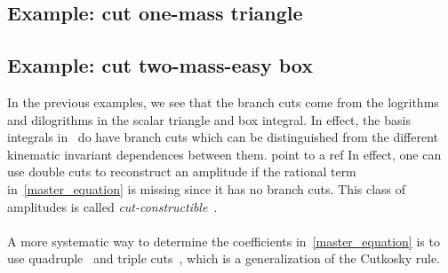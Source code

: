 \subsection{Example: cut one-mass triangle}
%
\subsection{Example: cut two-mass-easy box}
%
In the previous examples, we see that the branch cuts come from the logrithms and dilogrithms in the scalar triangle and box integral. 
In effect, the basis integrals in~\cite{master_equation} do have branch cuts which can be distinguished from the different kinematic invariant dependences between them.
\color{red}point to a ref\color{black}
In effect, one can use double cuts to reconstruct an amplitude if the rational term in~\cref{master_equation} is missing since it has no branch cuts.
This class of amplitudes is called \textit{cut-constructible}~\cite{Bern:1994cg}. 
\\\\
A more systematic way to determine the coefficients in~\cref{master_equation} is to use quadruple~\cite{BRITTO2005499} and triple cuts~\cite{Forde:2007mi}, which is a generalization of the Cutkosky rule.